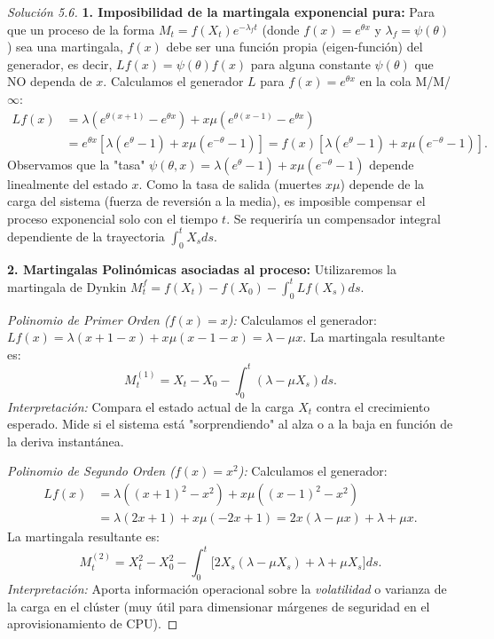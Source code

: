 \documentclass[10pt,a4paper]{article}
\begin{document}
\begin{proof}[Solución  5.6]
    \textbf{1. Imposibilidad de la martingala exponencial pura:}
    Para que un proceso de la forma $M_t = f(X_t)e^{-\lambda_f t}$ (donde $f(x) = e^{\theta x}$ y $\lambda_f = \psi(\theta)$) sea una martingala, $f(x)$ debe ser una función propia (eigen-función) del generador, es decir, $Lf(x) = \psi(\theta)f(x)$ para alguna constante $\psi(\theta)$ que NO dependa de $x$.
    Calculamos el generador $L$ para $f(x) = e^{\theta x}$ en la cola M/M/$\infty$:
    \begin{align*}
        Lf(x) &= \lambda(e^{\theta(x+1)} - e^{\theta x}) + x\mu(e^{\theta(x-1)} - e^{\theta x}) \\
        &= e^{\theta x} \left[ \lambda(e^\theta - 1) + x\mu(e^{-\theta} - 1) \right] = f(x) \left[ \lambda(e^\theta - 1) + x\mu(e^{-\theta} - 1) \right].
    \end{align*}
    Observamos que la "tasa" $\psi(\theta, x) = \lambda(e^\theta - 1) + x\mu(e^{-\theta} - 1)$ depende linealmente del estado $x$. Como la tasa de salida (muertes $x\mu$) depende de la carga del sistema (fuerza de reversión a la media), es imposible compensar el proceso exponencial solo con el tiempo $t$. Se requeriría un compensador integral dependiente de la trayectoria $\int_0^t X_s ds$.

    \textbf{2. Martingalas Polinómicas asociadas al proceso:}
    Utilizaremos la martingala de Dynkin $M_t^f = f(X_t) - f(X_0) - \int_0^t Lf(X_s)ds$.
    
    \textit{Polinomio de Primer Orden ($f(x) = x$):}
    Calculamos el generador: $Lf(x) = \lambda(x+1-x) + x\mu(x-1-x) = \lambda - \mu x$.
    La martingala resultante es:
    \[ M_t^{(1)} = X_t - X_0 - \int_0^t (\lambda - \mu X_s) ds. \]
    \textit{Interpretación:} Compara el estado actual de la carga $X_t$ contra el crecimiento esperado. Mide si el sistema está "sorprendiendo" al alza o a la baja en función de la deriva instantánea.

    \textit{Polinomio de Segundo Orden ($f(x) = x^2$):}
    Calculamos el generador: 
    \begin{align*}
        Lf(x) &= \lambda((x+1)^2 - x^2) + x\mu((x-1)^2 - x^2) \\
        &= \lambda(2x + 1) + x\mu(-2x + 1) = 2x(\lambda - \mu x) + \lambda + \mu x.
    \end{align*}
    La martingala resultante es:
    \[ M_t^{(2)} = X_t^2 - X_0^2 - \int_0^t \Big[ 2X_s(\lambda - \mu X_s) + \lambda + \mu X_s \Big] ds. \]
    \textit{Interpretación:} Aporta información operacional sobre la \textit{volatilidad} o varianza de la carga en el clúster (muy útil para dimensionar márgenes de seguridad en el aprovisionamiento de CPU).
\end{proof}
\end{document}
